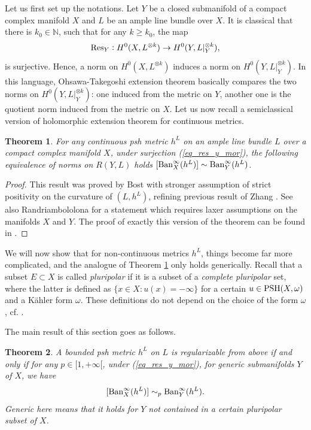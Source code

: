 \documentclass[12pt]{article}
\numberwithin{equation}{section}
\theoremstyle{theorem}
\newtheorem{thm}{Theorem}[section]
\theoremstyle{definition}
\theoremstyle{remark}
\newcommand{\res}{{\rm{Res}}}
\newcommand{\nat}{\mathbb{N}}
\begin{document}
	\par 
	Let us first set up the notations.
	Let $Y$ be a closed submanifold of a compact complex manifold $X$ and $L$ be an ample line bundle over $X$.
	It is classical that there is $k_0 \in \nat$, such that for any $k \geq k_0$, the map	
	\begin{equation}\label{eq_res_y_mor}
	 	\res_Y : H^0(X, L^{\otimes k}) \to H^0(Y, L|_Y^{\otimes k}),
	 \end{equation}
	is surjective. Hence, a norm on $H^0(X, L^{\otimes k})$ induces a norm on $H^0(Y, L|_Y^{\otimes k})$.
	In this language, Ohsawa-Takegoshi extension theorem basically compares the two norms on $H^0(Y, L|_Y^{\otimes k})$: one induced from the metric on $Y$, another one is the quotient norm induced from the metric on $X$.
	Let us now recall a semiclassical version of holomorphic extension theorem for continuous metrics.
 	\begin{thm}\label{thm_ot_semi}
 		For any continuous psh metric $h^L$ on an ample line bundle $L$ over a compact complex manifold $X$, under surjection (\ref{eq_res_y_mor}), the following equivalence of norms on $R(Y, L)$ holds
		$
			[{\rm{Ban}}^{\infty}_{X}(h^L)] \sim {\rm{Ban}}^{\infty}_{Y}(h^L)
		$.
	\end{thm}
	\begin{proof}
		This result was proved by Bost \cite[Theorem A.1]{BostDwork} with stronger assumption of strict positivity on the curvature of $(L, h^L)$, refining previous result of Zhang \cite{ZhangPosLinBun}.
		See also Randriambololona \cite{RandriamCrelle} for a statement which requires laxer assumptions on the manifolds $X$ and $Y$.
		The proof of exactly this version of the theorem can be found in \cite[Corollary 2.12]{FinSecRing}.
	\end{proof}
	We will now show that for non-continuous metrics $h^L$, things become far more complicated, and the analogue of Theorem \ref{thm_ot_semi} only holds generically.
	Recall that a subset $E \subset X$ is called \textit{pluripolar} if it is a subset of a \textit{complete pluripolar} set, where the latter is defined as $\{ x \in X : u(x) = - \infty \}$ for a certain $u \in {\rm{PSH}}(X, \omega)$ and a Kähler form $\omega$.
	These definitions do not depend on the choice of the form $\omega$, cf. \cite[Proposition 2.3]{GuedZeriGeomAnal}.
	\par 
	The main result of this section goes as follows.
 	\begin{thm}\label{thm_ot_gen}
 		A bounded psh metric $h^L$ on $L$ is regularizable from above if and only if for any $p \in [1, +\infty[$, under (\ref{eq_res_y_mor}), for generic submanifolds $Y$ of $X$, we have
		\begin{equation}\label{eq_ot_gen}
			[{\rm{Ban}}^{\infty}_{X}(h^L)] \sim_p {\rm{Ban}}^{\infty}_{Y}(h^L).
		\end{equation}
		Generic here means that it holds for $Y$ not contained in a certain pluripolar subset of $X$.
	\end{thm}
\end{document}

